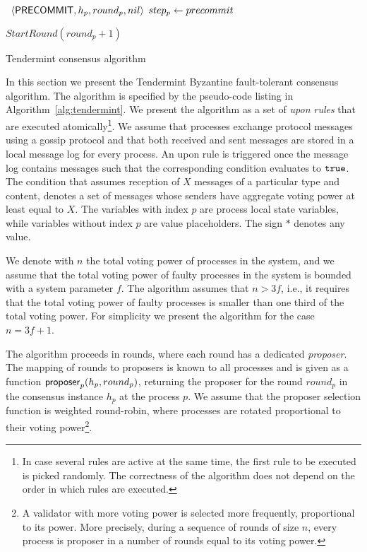 \begin{algorithm}[htb!]
\begin{algorithmic}[1]
\SHORTSPACE {}
\label{line:tab:onTimeoutPrevote}  \STATE \Broadcast \
$\langle\mathsf{PRECOMMIT},h_p,round_p,nil\rangle$   \label{line:tab:precommit-nil-onTimeout}
\STATE $step_p \leftarrow precommit$ \ENDIF	\ENDFUNCTION

\SHORTSPACE {}
\label{line:tab:onTimeoutPrecommit} 
\STATE $StartRound(round_p + 1)$ \label{line:tab:nextRound} \ENDIF
\ENDFUNCTION	\end{algorithmic} \caption{Tendermint consensus algorithm}
\label{alg:tendermint} \end{algorithm}

In this section we present the Tendermint Byzantine fault-tolerant consensus
algorithm.  The algorithm is specified by the pseudo-code listing in
Algorithm~\ref{alg:tendermint}. We present the algorithm as a set of \emph{upon
rules} that are executed atomically\footnote{In case several rules are active
at the same time, the first rule to be executed is picked randomly. The
correctness of the algorithm does not depend on the order in which rules are
executed.}. We assume that processes exchange protocol messages using a gossip
protocol and that both received and sent messages are stored in a local message
log for every process. An upon rule is triggered once the message log contains
messages such that the corresponding condition evaluates to $\tt{true}$. The
condition that assumes reception of $X$ messages of a particular type and
content, denotes a set of messages whose senders have aggregate voting power at
least equal to $X$. The variables with index $p$ are process local state
variables, while variables without index $p$ are value placeholders. The sign
$*$ denotes any value.    

We denote with $n$ the total voting power of processes in the system, and we
assume that the total voting power of faulty processes in the system is bounded
with a system parameter $f$.  The algorithm assumes that $n > 3f$, i.e., it
requires that the total voting power of faulty processes is smaller than one
third of the total voting power. For simplicity we present the algorithm for
the case $n = 3f + 1$.

The algorithm proceeds in rounds, where each round has a dedicated
\emph{proposer}. The mapping of rounds to proposers is known to all processes
and is given as a function $\mathsf{proposer}_p(h_p, round_p)$, returning the proposer for
the round $round_p$ in the consensus instance $h_p$ at the process $p$. We
assume that the proposer selection function is weighted round-robin, where
processes are rotated proportional to their voting power\footnote{A validator
with more voting power is selected more frequently, proportional to its power.
More precisely, during a sequence of rounds of size $n$, every process is
proposer in a number of rounds equal to its voting power.}. 

